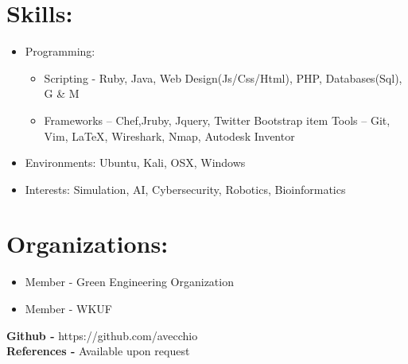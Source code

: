 \documentclass{res}
\begin{document}
\section{Skills:}
\begin{itemize}
\item Programming:
\begin{itemize}[label=$\circ$]
\item Scripting - Ruby, Java, Web Design(Js/Css/Html), PHP, Databases(Sql), G \& M
\item Frameworks – Chef,Jruby, Jquery, Twitter Bootstrap
item Tools – Git, Vim, \LaTeX, Wireshark, Nmap, Autodesk Inventor
\end{itemize}
\item Environments: Ubuntu, Kali, OSX, Windows
\item Interests: Simulation, AI, Cybersecurity, Robotics, Bioinformatics
\end{itemize}
\section{Organizations:}
\begin{itemize}
\item Member - Green Engineering Organization
\item Member - WKUF
\end{itemize}


\begin{center}
\textbf{Github - }https://github.com/avecchio\\
\textbf{References - }Available upon request
\end{center}
\end{document}
